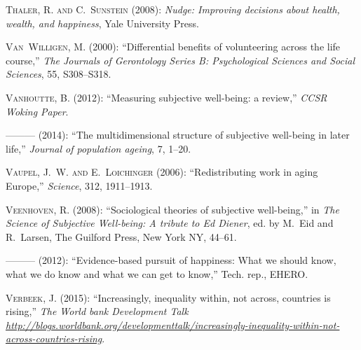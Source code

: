 \documentclass[10pt, letterpaper]{article}
\begin{document}
\begin{spacing}{1.4}
\begin{thebibliography}{91}
\textsc{Thaler, R. and C.~Sunstein} (2008): \emph{Nudge: Improving decisions
  about health, wealth, and happiness}, Yale University Press.

\textsc{Van~Willigen, M.} (2000): \enquote{Differential benefits of
  volunteering across the life course,} \emph{The Journals of Gerontology
  Series B: Psychological Sciences and Social Sciences}, 55, S308--S318.

\textsc{Vanhoutte, B.} (2012): \enquote{Measuring subjective well-being: a
  review,} \emph{CCSR Woking Paper}.

---\hspace{-.1pt}---\hspace{-.1pt}--- (2014): \enquote{The multidimensional
  structure of subjective well-being in later life,} \emph{Journal of
  population ageing}, 7, 1--20.

\textsc{Vaupel, J.~W. and E.~Loichinger} (2006): \enquote{Redistributing work
  in aging Europe,} \emph{Science}, 312, 1911--1913.

\textsc{Veenhoven, R.} (2008): \enquote{Sociological theories of subjective
  well-being,} in \emph{The Science of Subjective Well-being: A tribute to Ed
  Diener}, ed. by M.~Eid and R.~Larsen, The Guilford Press, New York NY,
  44--61.

---\hspace{-.1pt}---\hspace{-.1pt}--- (2012): \enquote{Evidence-based pursuit
  of happiness: What we should know, what we do know and what we can get to
  know,} Tech. rep., EHERO.

\textsc{Verbeek, J.} (2015): \enquote{Increasingly, inequality within, not
  across, countries is rising,} \emph{The World bank Development Talk
  \url{http://blogs.worldbank.org/developmenttalk/increasingly-inequality-within-not-across-countries-rising}}.


\end{thebibliography}
\end{spacing}
\end{document}
